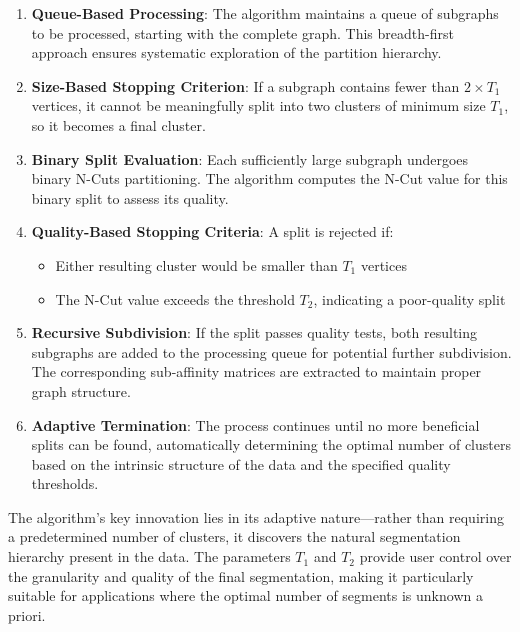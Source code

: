 \documentclass[12pt,a4paper]{article}
\begin{document}
{\begin{enumerate}
    \item \textbf{Queue-Based Processing}: The algorithm maintains a queue of subgraphs to be processed, starting with the complete graph. This breadth-first approach ensures systematic exploration of the partition hierarchy.
    
    \item \textbf{Size-Based Stopping Criterion}: If a subgraph contains fewer than $2 \times T_1$ vertices, it cannot be meaningfully split into two clusters of minimum size $T_1$, so it becomes a final cluster.
    
    \item \textbf{Binary Split Evaluation}: Each sufficiently large subgraph undergoes binary N-Cuts partitioning. The algorithm computes the N-Cut value for this binary split to assess its quality.
    
    \item \textbf{Quality-Based Stopping Criteria}: A split is rejected if:
        \begin{itemize}
            \item Either resulting cluster would be smaller than $T_1$ vertices
            \item The N-Cut value exceeds the threshold $T_2$, indicating a poor-quality split
        \end{itemize}
    
    \item \textbf{Recursive Subdivision}: If the split passes quality tests, both resulting subgraphs are added to the processing queue for potential further subdivision. The corresponding sub-affinity matrices are extracted to maintain proper graph structure.
    
    \item \textbf{Adaptive Termination}: The process continues until no more beneficial splits can be found, automatically determining the optimal number of clusters based on the intrinsic structure of the data and the specified quality thresholds.
\end{enumerate}

The algorithm's key innovation lies in its adaptive nature—rather than requiring a predetermined number of clusters, it discovers the natural segmentation hierarchy present in the data. The parameters $T_1$ and $T_2$ provide user control over the granularity and quality of the final segmentation, making it particularly suitable for applications where the optimal number of segments is unknown a priori.









}
\end{document}

